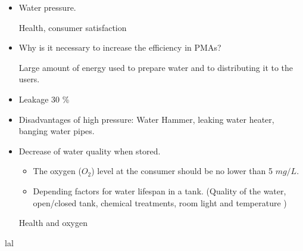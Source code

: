  
\begin{itemize}
\item Water pressure. 

Health, consumer satisfaction
\item Why is it necessary to increase the efficiency in PMAs?

Large amount of energy used to prepare water and to distributing it to the users. 
\item Leakage 30 \%
\item Disadvantages of high pressure: Water Hammer, leaking water heater, banging 
water pipes. %
\item Decrease of water quality when stored. 
\begin{itemize}
\item The oxygen ($O_2$) level at the consumer should be no lower than 5 $mg/L$. 
\item Depending factors for water lifespan in a tank. (Quality of the water, open/closed tank, chemical treatments, room light and temperature )  %
\end{itemize}
Health and oxygen 
\end{itemize}





lal